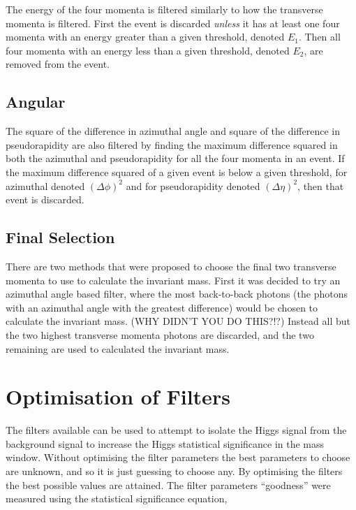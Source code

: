 \documentclass[11pt]{amsart}
\begin{document}
\begin{multicols}{2}
The energy of the four momenta is filtered similarly to how the transverse momenta is filtered. First the event is discarded \textit{unless} it has at least one four momenta with an energy greater than a given threshold, denoted $E_1$. Then all four momenta with an energy less than a given threshold, denoted $E_2$, are removed from the event.

\subsection{Angular}

The square of the difference in azimuthal angle and square of the difference in pseudorapidity are also filtered by finding the maximum difference squared in both the azimuthal and pseudorapidity for all the four momenta in an event. If the maximum difference squared of a given event is below a given threshold, for azimuthal denoted ${(\Delta \phi)}^2$ and for pseudorapidity denoted ${(\Delta \eta)}^2$, then that event is discarded.

\subsection{Final Selection}

There are two methods that were proposed to choose the final two transverse momenta to use to calculate the invariant mass. First it was decided to try an azimuthal angle based filter, where the most back-to-back photons (the photons with an azimuthal angle with the greatest difference) would be chosen to calculate the invariant mass. (WHY DIDN'T YOU DO THIS?!?) Instead all but the two highest transverse momenta photons are discarded, and the two remaining are used to calculated the invariant mass.


\section{Optimisation of Filters}
\label{sec:optimisation}

The filters available can be used to attempt to isolate the Higgs signal from the background signal to increase the Higgs statistical significance in the mass window. Without optimising the filter parameters the best parameters to choose are unknown, and so it is just guessing to choose any. By optimising the filters the best possible values are attained. The filter parameters ``goodness'' were measured using the statistical significance equation,


\end{multicols}
\end{document}
